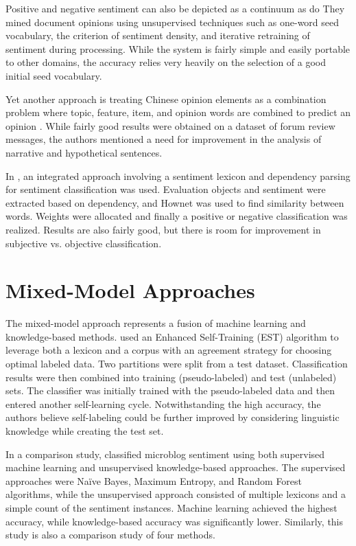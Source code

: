\documentclass [11pt, proquest] {uwthesis}[2020/02/24]
\begin{document}
Positive and negative sentiment can also be depicted as a continuum as do \cite{Zagibalov2008} They mined document opinions using unsupervised techniques such as one-word seed vocabulary, the criterion of sentiment density, and iterative retraining of sentiment during processing. While the system is fairly simple and easily portable to other domains, the accuracy relies very heavily on the selection of a good initial seed vocabulary.  

Yet another approach is treating Chinese opinion elements as a combination problem where topic, feature, item, and opinion words are combined to predict an opinion \citep{Wu2015}. While fairly good results were obtained on a dataset of forum review messages, the authors mentioned a need for improvement in the analysis of narrative and hypothetical sentences. 

In \cite{Quan2013}, an integrated approach involving a sentiment lexicon and dependency parsing for sentiment classification was used. Evaluation objects and sentiment were extracted based on dependency, and Hownet was used to find similarity between words. Weights were allocated and finally a positive or negative classification was realized. Results are also fairly good, but there is room for improvement in subjective vs. objective classification. 
\section{Mixed-Model Approaches}
The mixed-model approach represents a fusion of machine learning and knowledge-based methods. \cite{Zhang2013} used an Enhanced Self-Training (EST) algorithm to leverage both a lexicon and a corpus with an agreement strategy for choosing optimal labeled data. Two partitions were split from a test dataset. Classification results were then combined into training (pseudo-labeled) and test (unlabeled) sets. The classifier was initially trained with the pseudo-labeled data and then entered another self-learning cycle. Notwithstanding the high accuracy, the authors believe self-labeling could be further improved by considering linguistic knowledge while creating the test set. 

In a comparison study, \cite{Yuan2013} classified microblog sentiment using both supervised machine learning and unsupervised knowledge-based approaches. The supervised approaches were Naïve Bayes, Maximum Entropy, and Random Forest algorithms, while the unsupervised approach consisted of multiple lexicons and a simple count of the sentiment instances. Machine learning achieved the highest accuracy, while knowledge-based accuracy was significantly lower. Similarly, this study is also a comparison study of four methods.
\end{document}
